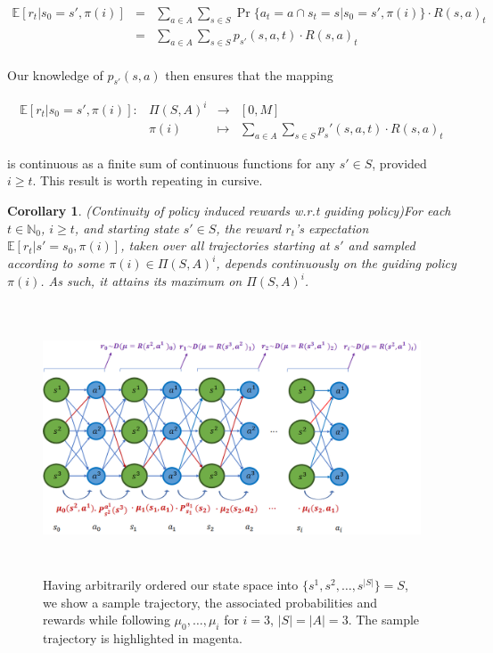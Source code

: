 \documentclass[11pt]{article} %
\newtheorem{cor}{Corollary}
\begin{document}
\begin{equation}\label{eqExpReward}
	\begin{array}{rcl}
		\mathbb{E}[r_t | s_0 = s', \pi(i)]	& = &	\sum\limits_{a \in A} \sum\limits_{s \in S} \Pr \{a_t = a \cap s_t = s | s_0 = s', \pi(i)\} \cdot R(s,a)_t \\
								& = &	\sum\limits_{a \in A} \sum\limits_{s \in S} p_{s'}(s,a,t) \cdot R(s,a)_t \\
	\end{array}
\end{equation}

Our knowledge of $p_{s'}(s,a)$ then ensures that the mapping

\begin{equation}\label{contExpRewMap}
	\begin{array}{rccl}
		\mathbb{E}[r_t | s_0 = s', \pi(i)]: 	& \Pi(S,A)^i 	& \rightarrow 	& [0,M] \\
									& \pi(i)				 		& \mapsto 	& \sum\limits_{a \in A} \sum\limits_{s \in S} p_s'(s,a,t) \cdot R(s,a)_t
	\end{array}
\end{equation}

is continuous as a finite sum of continuous functions for any $s' \in S$, provided $i \ge t$. This result is worth repeating in cursive.

\begin{cor}{(Continuity of policy induced rewards w.r.t guiding policy)}\label{corContinuousReward}
For each $t \in \mathbb{N}_0$, $i \ge t$, and starting state $s' \in S$, the reward $r_t$'s expectation $\mathbb{E}[r_t | s' = s_0, \pi(i)]$, taken over all trajectories starting at $s'$ and sampled according to some $\pi(i) \in \Pi(S,A)^i$, depends continuously on the guiding policy $\pi(i)$. As such, it attains its maximum on $\Pi(S,A)^i$.
\end{cor}

\begin{figure}
  \includegraphics[width=\linewidth,height=8cm]{../graphics/control_law_trajectory_rewards.png}
  \caption{Having arbitrarily ordered our state space into $\{s^1,s^2,\dots,s^{|S|} \} = S$, we show a sample trajectory, the associated probabilities and rewards while following $\mu_0,\dots,\mu_i$ for $i = 3$, $|S| = |A| = 3$. The sample trajectory is highlighted in magenta.}
  \label{fig:boat1}
\end{figure}
\end{document}
